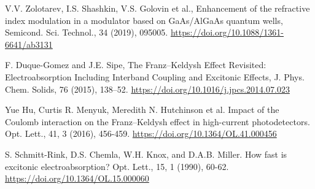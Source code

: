 \documentclass[a4paper,14pt]{extarticle}
\begin{document}
\begin{thebibliography}{99}
     V.V. Zolotarev, I.S. Shashkin, V.S. Golovin et al., Enhancement of the refractive index modulation in a modulator based on GaAs/AlGaAs quantum wells, Semicond. Sci. Technol., 34 (2019), 095005. \url{https://doi.org/10.1088/1361-6641/ab3131}
    
     F. Duque-Gomez and J.E. Sipe, The Franz–Keldysh Effect Revisited: Electroabsorption Including Interband Coupling and Excitonic Effects, J. Phys. Chem. Solids, 76 (2015), 138–52. \url{https://doi.org/10.1016/j.jpcs.2014.07.023}
    
     Yue Hu, Curtis R. Menyuk, Meredith N. Hutchinson et al. Impact of the Coulomb interaction on the Franz–Keldysh effect in high-current photodetectors. Opt. Lett., 41, 3 (2016), 456-459. \url{https://doi.org/10.1364/OL.41.000456}
    
     S. Schmitt-Rink, D.S. Chemla, W.H. Knox, and D.A.B. Miller. How fast is excitonic electroabsorption? Opt. Lett., 15, 1 (1990), 60-62. \url{https://doi.org/10.1364/OL.15.000060}

\end{thebibliography}
\end{document}
